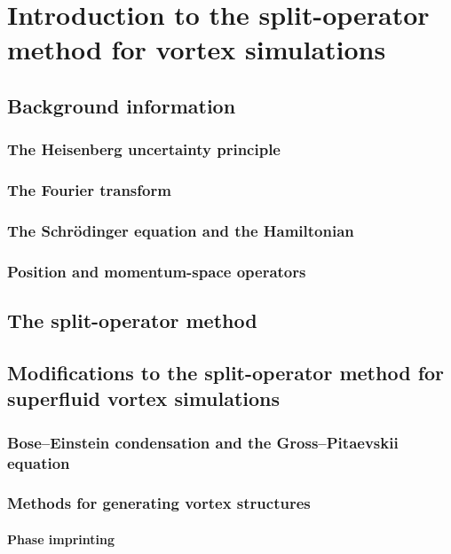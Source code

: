 \chapter{Introduction to the split-operator method for vortex simulations}
\label{ch-splitop}

\section{Background information}
\subsection{The Heisenberg uncertainty principle}

\subsection{The Fourier transform}

\subsection{The Schr\"odinger equation and the Hamiltonian}

\subsection{Position and momentum-space operators}

\section{The split-operator method}

\section{Modifications to the split-operator method for superfluid vortex simulations}

\subsection{Bose--Einstein condensation and the Gross--Pitaevskii equation}

\subsection{Methods for generating vortex structures}

\subsubsection{Phase imprinting}

